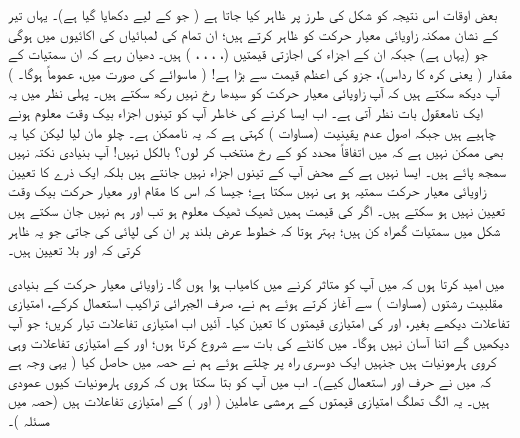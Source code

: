  بعض اوقات اس نتیجہ کو شکل  کی طرز پر ظاہر کیا جاتا ہے ( جو  کے لیے دکھایا گیا ہے)۔ یہاں تیر کے نشان ممکنہ زاویائی معیار حرکت کو ظاہر کرتے ہیں؛ ان تمام کی لمبائیاں  کی اکائیوں میں  ہوگی جو (یہاں  ہے) جبکہ ان کے  اجزاء  کی اجازتی قیمتیں (، ، ، ، ) ہیں۔ دھیان رہے کہ ان سمتیات کے مقدار ( یعنی کرہ کا رداس)،  جزو کی اعظم قیمت سے بڑا ہے! ( ماسوائے  کی صورت میں، عموماً  ہوگا۔ ) آپ دیکھ سکتے ہیں کہ آپ زاویائی معیار حرکت کو سیدھا  رخ نہیں رکھ سکتے ہیں۔ پہلی نظر میں یہ ایک نامعقول بات نظر آتی ہے۔ اب ایسا کرنے کی خاطر آپ کو تینوں اجزاء بیک وقت معلوم ہونے چاہیے ہیں جبکہ اصول عدم یقینیت (مساوات ) کہتی ہے کہ یہ ناممکن ہے۔ چلو مان لیا لیکن کیا یہ بھی ممکن نہیں ہے کہ میں اتفاقاً  محدد کو  کے رخ منتخب کر لوں؟ بالکل نہیں! آپ بنیادی نکتہ نہیں سمجھ پائے ہیں۔ ایسا نہیں ہے کے محض آپ  کے تینوں اجزاء نہیں جانتے ہیں بلکہ ایک ذرے کا تعیین زاویائی معیار حرکت سمتیہ ہو ہی نہیں سکتا ہے؛ جیسا کہ اس کا مقام اور معیار حرکت بیک وقت تعیین نہیں ہو سکتے ہیں۔ اگر  کی قیمت ہمیں ٹھیک ٹھیک معلوم ہو تب  اور  ہم نہیں جان سکتے ہیں شکل  میں سمتیات گمراہ کن ہیں؛ بہتر ہوتا کہ خطوط عرض بلند پر ان کی لپائی کی جاتی جو یہ ظاہر کرتی کہ  اور  بلا تعیین ہیں۔

 میں امید کرتا ہوں کہ میں آپ کو متاثر کرنے میں کامیاب ہوا ہوں گا۔ زاویائی معیار حرکت کے بنیادی مقلبیت رشتوں (مساوات ) سے آغاز کرتے ہوئے ہم نے، صرف الجبرائی تراکیب استعمال کرکے، امتیازی تفاعلات دیکھے بغیر،  اور  کی  امتیازی قیمتوں  کا  تعین کیا۔ آئیں اب امتیازی تفاعلات تیار کریں؛ جو آپ دیکھیں گے اتنا آسان نہیں ہوگا۔ میں کانٹے کی بات  سے شروع کرتا ہوں؛  اور  کے امتیازی تفاعلات وہی کروی ہارمونیات ہیں جنہیں ایک دوسری راہ پر چلتے ہوئے ہم نے حصہ  میں حاصل کیا ( یہی وجہ ہے کہ میں نے حرف  اور  استعمال کیے)۔ اب میں آپ کو بتا سکتا ہوں کہ کروی ہارمونیات کیوں عمودی ہیں۔ یہ الگ تھلگ امتیازی قیمتوں  کے ہرمشی عاملین (  اور ) کے امتیازی تفاعلات ہیں (حصہ  میں مسئلہ )۔ 

